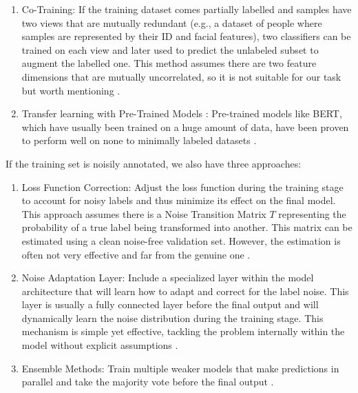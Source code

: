 \documentclass{article}
\begin{document}
\begin{enumerate}
    \item Co-Training: If the training dataset comes partially labelled and samples have two views that are mutually redundant (e.g., a dataset of people where samples are represented by their ID and facial features), two classifiers can be trained on each view and later used to predict the unlabeled subset to augment the labelled one. This method assumes there are two feature dimensions that are mutually uncorrelated, so it is not suitable for our task but worth mentioning {\color{blue}{[23]}}.
    \item Transfer learning with Pre-Trained Models : Pre-trained models like BERT, which have usually been trained on a huge amount of data, have been proven to perform well on none to minimally labeled datasets {\color{blue}{[24]}}.
\end{enumerate}

If the training set is noisily annotated, we also have three approaches:\hypertarget{hpi}{{}}
\begin{enumerate}
    \item Loss Function Correction: Adjust the loss function during the training stage to account for noisy labels and thus minimize its effect on the final model. This approach assumes there is a Noise Transition Matrix \( T \) representing the probability of a true label being transformed into another. This matrix can be estimated using a clean noise-free validation set. However, the estimation is often not very effective and far from the genuine one {\color{blue}{[25]}}.
    \item Noise Adaptation Layer: Include a specialized layer within the model architecture that will learn how to adapt and correct for the label noise. This layer is usually a fully connected layer before the final output and will dynamically learn the noise distribution during the training stage. This mechanism is simple yet effective, tackling the problem internally within the model without explicit assumptions {\color{blue}{[26]}}.
    \item Ensemble Methods: Train multiple weaker models that make predictions in parallel and take the majority vote before the final output {\color{blue}{[27]}}.
\end{enumerate}
\end{document}
